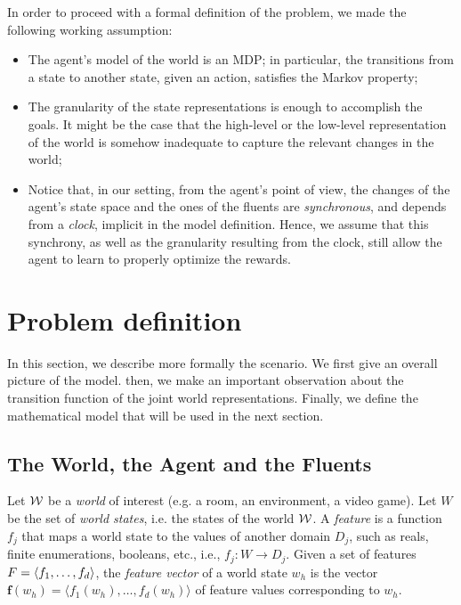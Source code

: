 In order to proceed with a formal definition of the problem, we made the following working assumption:
\begin{itemize}
	\item The agent's model of the world is an MDP; in particular, the transitions from a state to another state, given an action, satisfies the Markov property;
	\item The granularity of the state representations is enough to accomplish the \LLf goals. It might be the case that the high-level or the low-level representation of the world is somehow inadequate to capture the relevant changes in the world;
	\item Notice that, in our setting, from the agent's point of view, the changes of the agent's state space and the ones of the fluents are \emph{synchronous}, and depends from a \emph{clock}, implicit in the model definition. Hence, we assume that this synchrony, as well as the granularity resulting from the clock, still allow the agent to learn to properly optimize the rewards.
\end{itemize}


\section{Problem definition}
\label{sect:problem-definition}
In this section, we describe more formally the scenario. We first give an overall picture of the model. then, we make an important observation about the transition function of the joint world representations. Finally, we define the mathematical model that will be used in the next section.
\subsection{The World, the Agent and the Fluents}
Let $\mathcal{W}$ be a \emph{world} of interest (e.g. a room, an environment, a video game). Let $W$ be the set of \emph{world states}, i.e. the states of the world $\mathcal{W}$. 
A \emph{feature} is a function $f_j$ that maps a world state to the
values of another domain $D_j$, such as reals, finite enumerations,
booleans, etc., i.e., $f_j : W \rightarrow D_j$.
Given a set of features $F = \langle f_1, \dots, f_d \rangle$, the \emph{feature vector} of a world state $w_h$ is the vector
$\mathbf{f}(w_h) = \langle f_1(w_h), \ldots, f_d(w_h) \rangle$ of
feature values corresponding to $w_h$.

